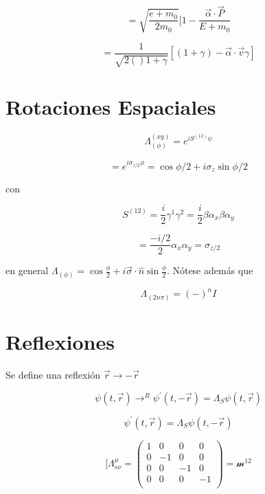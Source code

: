 \documentclass{report}
\begin{document}
\[= \sqrt{\frac{e+m_0}{2m_0}}[1-\frac{\overrightarrow{\alpha} \cdot \overrightarrow{P}}{E+m_0}\]

\begin{equation}
= \frac{1}{\sqrt{2()1+\gamma}} [(1+ \gamma) - \overrightarrow{\alpha} \cdot \overrightarrow{v} \gamma]
\end{equation}

\section{Rotaciones Espaciales}

\[\Lambda^{(xy)}_{(\phi)} = e^{i S^{(12)}\psi}\]

\begin{equation}
= e^{i \sigma_{z/2} \phi} = \cos \phi/2 + i \sigma_{z} \sin \phi/2
\end{equation}

con

\[S^{(12)} = \frac{i}{2} \gamma^1 \gamma^2 = \frac{i}{2} \beta \alpha_x \beta \alpha_y\]

\begin{equation}
= \frac{-i/2}{2}\alpha_x \alpha_y  = \sigma_{z/2}
\end{equation}

en general $\Lambda_{(\phi)} = \cos \frac{\phi}{2} + i \overrightarrow{\sigma} \cdot \hat{n} \sin \frac{\phi}{2}$. Nótese además que

\begin{equation}
\Lambda_{(2n\pi)} = (-)^{n}I
\end{equation}

\section{Reflexiones}

Se define una reflexi\'on $\overrightarrow{r} \rightarrow -\overrightarrow{r}$

\begin{equation}
\psi (t,\overrightarrow{r})\rightarrow^{R} \psi^{\prime}(t,-\overrightarrow{r}) = \Lambda_{S} \psi (t,\overrightarrow{r})
\end{equation}

\[\psi^{\prime} (t, \overrightarrow{r}) = \Lambda_{S} \psi (t,- \overrightarrow{r})\]

\[[\Lambda^{\mu}_{s \nu} = \left ( \begin{array}{cccc}
 1 & 0 & 0 & 0 \\
 0 & -1 & 0 &0 \\
 0 & 0 & -1 & 0 \\
0 & 0 & 0 & -1 \\ \end{array} \right) = \mathscr{m}^{12}
\]
\end{document}
